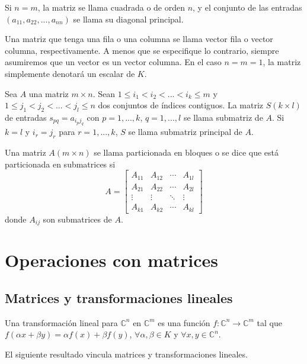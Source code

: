 Si $n = m$, la matriz se llama cuadrada o de orden $n$, y el conjunto de las entradas $(a_{11}, a_{22}, ..., a_{nn})$ se llama su diagonal principal.

Una matriz que tenga una fila o una columna se llama vector fila o vector columna, respectivamente. A menos que se especifique lo contrario, siempre asumiremos que un vector es un vector columna. En el caso $n = m = 1$, la matriz simplemente denotará un escalar de $K$.

\begin{definition}
    Sea $A$ una matriz $m \times n$. Sean $1 \leq i_1 < i_2 < ... < i_k \leq m$ y $1 \leq j_1 < j_2 < ... < j_l \leq n$ dos conjuntos de índices contiguos. La matriz $S(k \times l)$ de entradas $s_{pq} = a_{i_p j_q}$ con $p = 1, ..., k$, $q = 1, ..., l$ se llama submatriz de $A$. Si $k = l$ y $i_r = j_r$ para $r = 1, ..., k$, $S$ se llama submatriz principal de $A$.
\end{definition}

\begin{definition}
    Una matriz $A(m \times n)$ se llama particionada en bloques o se dice que está particionada en submatrices si
    \[
    A = \begin{bmatrix}
        A_{11} & A_{12} & \cdots & A_{1l} \\
        A_{21} & A_{22} & \cdots & A_{2l} \\
        \vdots & \vdots & \ddots & \vdots \\
        A_{k1} & A_{k2} & \cdots & A_{kl}
    \end{bmatrix}
    \]
    donde $A_{ij}$ son submatrices de $A$.
\end{definition}


\section{Operaciones con matrices}
\subsection{Matrices y transformaciones lineales}
\begin{definition}
    Una transformación lineal para $\mathbb{C}^n$ en $\mathbb{C}^m$ es una función $f: \mathbb{C}^n \rightarrow \mathbb{C}^m$ tal que $f(\alpha x + \beta y) = \alpha f(x) + \beta f(y)$, $\forall \alpha , \beta \in K$ y $\forall x, y \in \mathbb{C}^n$.
\end{definition}

El siguiente resultado vincula matrices y transformaciones lineales.

